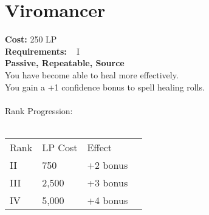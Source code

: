 \section{Viromancer}\label{perk:viromancer}
\textbf{Cost:} 250 LP\\
\textbf{Requirements:} ~ I\\
\textbf{Passive, Repeatable, Source}\\
You have become able to heal more effectively.\\
You gain a +1 confidence bonus to spell healing rolls.\\
\\
Rank Progression:\\
\\
\begin{tabular}{l | l | l | l}
    Rank & LP Cost &  Effect\\
    II & 750 & +2 bonus\\
    III & 2,500 & +3 bonus\\
    IV & 5,000 & +4 bonus\\
\end{tabular}